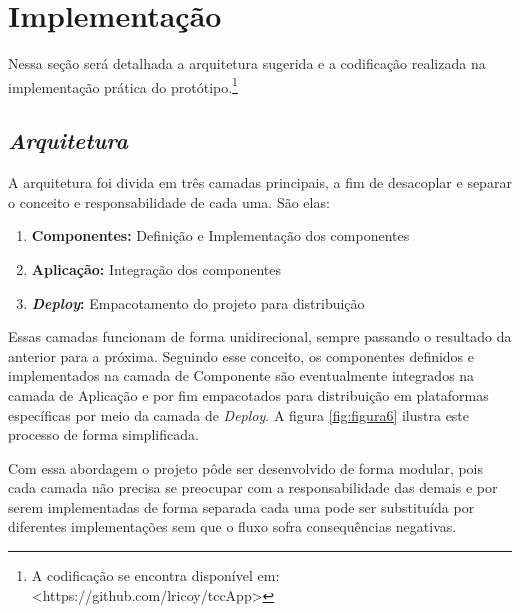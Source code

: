 
\section{\esp Implementação}

Nessa seção será detalhada a arquitetura sugerida e a codificação realizada na implementação prática do protótipo.\footnote{A codificação se encontra disponível em: <https://github.com/lricoy/tccApp>}

\subsection{{\it Arquitetura}}

A arquitetura foi divida em três camadas principais, a fim de desacoplar e separar o conceito e responsabilidade de cada uma. São elas:

\begin{enumerate}
	\item \textbf{Componentes:} Definição e Implementação dos componentes
	\item \textbf{Aplicação:} Integração dos componentes 
	\item \textbf{\textit{Deploy}:} Empacotamento do projeto para distribuição
\end{enumerate}

Essas camadas funcionam de forma unidirecional, sempre passando o resultado da anterior para a próxima. Seguindo esse conceito, os componentes definidos e implementados na camada de Componente são eventualmente integrados na camada de Aplicação e por fim empacotados para distribuição em plataformas específicas por meio da camada de \textit{Deploy}. A figura \ref{fig:figura6} ilustra este processo de forma simplificada.

Com essa abordagem o projeto pôde ser desenvolvido de forma modular, pois cada camada não precisa se preocupar com a responsabilidade das demais e por serem implementadas de forma separada cada uma pode ser substituída por diferentes implementações sem que o fluxo sofra consequências negativas.

